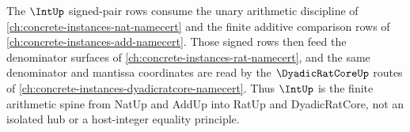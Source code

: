 \begin{proposition}
\label{prop:int-nat-add-rat-dyadic-dependency-spine}
The $\IntUp$ signed-pair rows consume the unary arithmetic discipline of \autoref{ch:concrete-instances-nat-namecert} and the finite additive comparison rows of \autoref{ch:concrete-instances-add-namecert}. Those signed rows then feed the denominator surfaces of \autoref{ch:concrete-instances-rat-namecert}, and the same denominator and mantissa coordinates are read by the $\DyadicRatCoreUp$ routes of \autoref{ch:concrete-instances-dyadicratcore-namecert}. Thus $\IntUp$ is the finite arithmetic spine from NatUp and AddUp into RatUp and DyadicRatCore, not an isolated hub or a host-integer equality principle.
\end{proposition}
